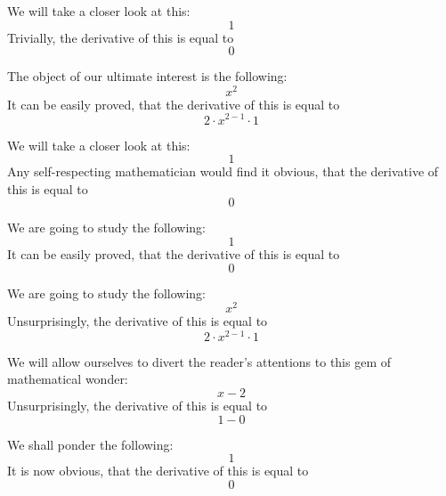 \documentclass{article}
\begin{document}
We will take a closer look at this:
\begin{equation}
1 
\end{equation}
Trivially, the derivative of this is equal to
\begin{equation}
0 
\end{equation}

The object of our ultimate interest is the following:
\begin{equation}
x ^{2 } 
\end{equation}
It can be easily proved, that the derivative of this is equal to
\begin{equation}
2 \cdot x ^{2 - 1 } \cdot 1 
\end{equation}

We will take a closer look at this:
\begin{equation}
1 
\end{equation}
Any self-respecting mathematician would find it obvious, that the derivative of this is equal to
\begin{equation}
0 
\end{equation}

We are going to study the following:
\begin{equation}
1 
\end{equation}
It can be easily proved, that the derivative of this is equal to
\begin{equation}
0 
\end{equation}

We are going to study the following:
\begin{equation}
x ^{2 } 
\end{equation}
Unsurprisingly, the derivative of this is equal to
\begin{equation}
2 \cdot x ^{2 - 1 } \cdot 1 
\end{equation}

We will allow ourselves to divert the reader's attentions to this gem of mathematical wonder:
\begin{equation}
x - 2 
\end{equation}
Unsurprisingly, the derivative of this is equal to
\begin{equation}
1 - 0 
\end{equation}

We shall ponder the following:
\begin{equation}
1 
\end{equation}
It is now obvious, that the derivative of this is equal to
\begin{equation}
0 
\end{equation}
\end{document}
